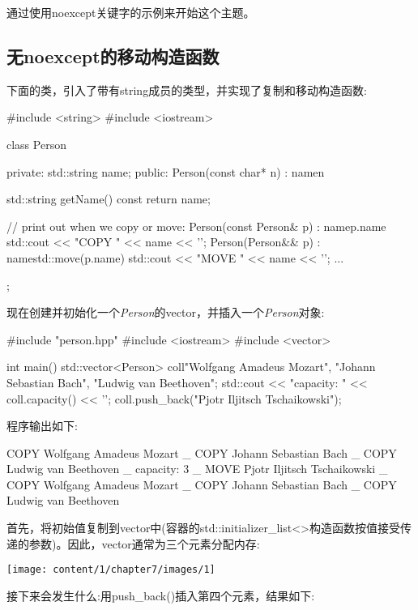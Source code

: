 通过使用noexcept关键字的示例来开始这个主题。

\subsection{无noexcept的移动构造函数}

下面的类，引入了带有string成员的类型，并实现了复制和移动构造函数:

\begin{cppcode}
#include <string>
#include <iostream>

class Person {
	private:
	std::string name;
	public:
	Person(const char* n)
	: name{n} {
	}

	std::string getName() const {
		return name;
	}

	// print out when we copy or move:
	Person(const Person& p)
	: name{p.name} {
		std::cout << "COPY " << name << '\n';
	}
	Person(Person&& p)
	: name{std::move(p.name)} {
		std::cout << "MOVE " << name << '\n';
	}
	...
};
\end{cppcode}

现在创建并初始化一个\textit{Person}的vector，并插入一个\textit{Person}对象:

\begin{cppcode}
#include "person.hpp"
#include <iostream>
#include <vector>

int main()
{
	std::vector<Person> coll{"Wolfgang Amadeus Mozart",
		"Johann Sebastian Bach",
		"Ludwig van Beethoven"};
	std::cout << "capacity: " << coll.capacity() << '\n';
	coll.push_back("Pjotr Iljitsch Tschaikowski");
}
\end{cppcode}

程序输出如下:

\begin{shell}
COPY Wolfgang Amadeus Mozart _
COPY Johann Sebastian Bach _
COPY Ludwig van Beethoven _
capacity: 3 _
MOVE Pjotr Iljitsch Tschaikowski _
COPY Wolfgang Amadeus Mozart _
COPY Johann Sebastian Bach _
COPY Ludwig van Beethoven
\end{shell}

首先，将初始值复制到vector中(容器的std::initializer_list<>构造函数按值接受传递的参数)。因此，vector通常为三个元素分配内存:

\begin{center}
	\texttt{[image: content/1/chapter7/images/1]}
\end{center}

接下来会发生什么:用push_back()插入第四个元素，结果如下:

